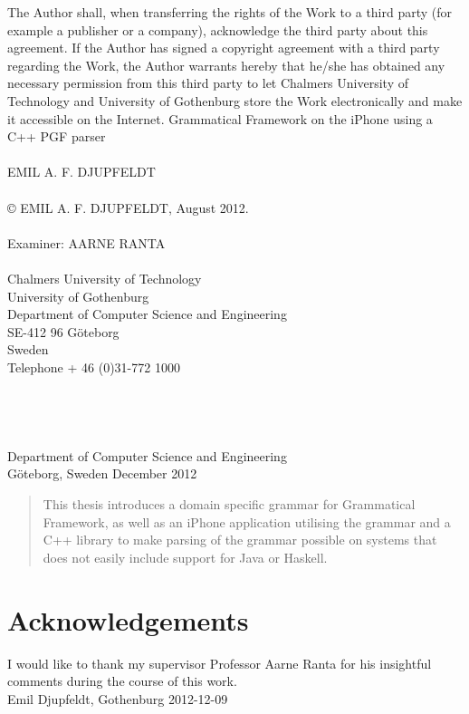 The Author shall, when transferring the rights of the Work to a third party (for example a publisher or a company), acknowledge the third party about this agreement. If the Author has signed a copyright agreement with a third party regarding the Work, the Author warrants hereby that he/she has obtained any necessary permission from this third party to let Chalmers University of Technology and University of Gothenburg  store the Work electronically and make it accessible on the Internet.
\vfill
Grammatical Framework on the iPhone using a C++ PGF parser\\
\\
EMIL A. F. DJUPFELDT\\
\\
© EMIL A. F. DJUPFELDT, August 2012.\\
\\
Examiner: AARNE RANTA\\
\\
Chalmers University of Technology\\
University of Gothenburg\\
Department of Computer Science and Engineering\\
SE-412 96 Göteborg\\
Sweden\\
Telephone + 46 (0)31-772 1000\\
\\
\\
\\
\\
Department of Computer Science and Engineering\\
Göteborg, Sweden December 2012

\newpage
\clearpage
\thispagestyle{empty}

\begin{abstract}
This thesis introduces a domain specific grammar for Grammatical Framework, as well as an iPhone application utilising the grammar and a C++ library to make parsing of the grammar possible on systems that does not easily include support for Java or Haskell.
\end{abstract}

\newpage
\clearpage
\mbox{}
\newpage
\clearpage
\thispagestyle{empty}
\section*{Acknowledgements}
I would like to thank my supervisor Professor Aarne Ranta for his insightful comments during the course of this work.\\[1cm]

\hfill Emil Djupfeldt, Gothenburg 2012-12-09
\newpage
\clearpage
\mbox{}